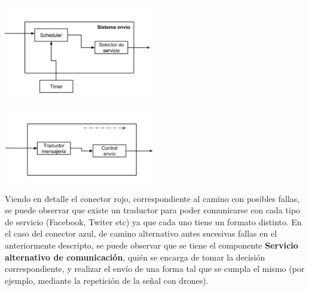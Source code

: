 \documentclass[a4paper, 11pt]{article}
\begin{document}
\centerline{\includegraphics[width=0.5\textwidth]{./diagramas/ArqTP2conector1.png}}
\centerline{\includegraphics[width=0.5\textwidth]{./diagramas/ArqTP2conector2.png}}

Viendo en detalle el conector rojo, correspondiente al camino con posibles fallas, se puede observar que existe un traductor para poder comunicarse con cada tipo de servicio (Facebook, Twiter etc) ya que cada uno tiene un formato distinto.
En el caso del conector azul, de camino alternativo antes sucesivas fallas en el anteriormente descripto, se puede observar que se tiene el componente \textbf{Servicio alternativo de comunicación}, quién se encarga de tomar la decisión correspondiente, y realizar el envío de una forma tal que se cumpla el mismo (por ejemplo, mediante la repetición de la señal con drones).\\

\end{document}
